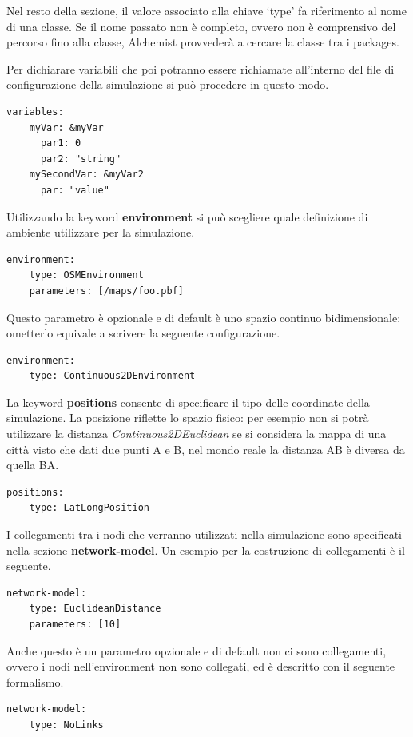 Nel resto della sezione, il valore associato alla chiave `type' fa riferimento al nome di una classe. Se il nome passato non è completo, ovvero non è comprensivo del percorso fino alla classe, Alchemist provvederà a cercare la classe tra i packages.

Per dichiarare variabili che poi potranno essere richiamate all'interno del file di configurazione della simulazione si può procedere in questo modo.
\medskip
\begin{lstlisting}[firstnumber=last,caption={Variabili simulazione}]
  variables:
    myVar: &myVar
      par1: 0
      par2: "string"
    mySecondVar: &myVar2
      par: "value"
\end{lstlisting}

Utilizzando la keyword \textbf{environment} si può scegliere quale definizione di ambiente utilizzare per la simulazione.
\medskip
\begin{lstlisting}[firstnumber=last,caption={Environment}]
  environment:
    type: OSMEnvironment
    parameters: [/maps/foo.pbf]
\end{lstlisting}
Questo parametro è opzionale e di default è uno spazio continuo bidimensionale: ometterlo equivale a scrivere la seguente configurazione.
\medskip
\begin{lstlisting}[firstnumber=last,caption={Default environment}]
  environment:
    type: Continuous2DEnvironment
\end{lstlisting}

La keyword \textbf{positions} consente di specificare il tipo delle coordinate della simulazione. La posizione riflette lo spazio fisico: per esempio non si potrà utilizzare la distanza \textit{Continuous2DEuclidean} se si considera la mappa di una città visto che dati due punti A e B, nel mondo reale la distanza AB è diversa da quella BA.
\medskip
\begin{lstlisting}[firstnumber=last,caption={Posizioni}]
  positions:
    type: LatLongPosition
\end{lstlisting}

I collegamenti tra i nodi che verranno utilizzati nella simulazione sono specificati nella sezione \textbf{network-model}. Un esempio per la costruzione di collegamenti è il seguente.
\medskip
\begin{lstlisting}[firstnumber=last,caption={Funzione linking-rule}]
  network-model:
    type: EuclideanDistance
    parameters: [10]
\end{lstlisting}
Anche questo è un parametro opzionale e di default non ci sono collegamenti, ovvero i nodi nell'environment non sono collegati, ed è descritto con il seguente formalismo.
\medskip
\begin{lstlisting}[firstnumber=last,caption={Default linking-rule}]
  network-model:
    type: NoLinks
\end{lstlisting}

